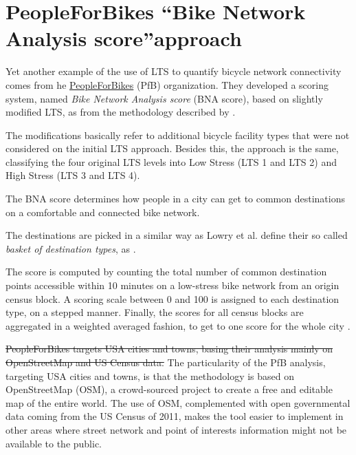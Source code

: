 \documentclass[information,article,submit,moreauthors,Latex,dvi2pdf,10pt,a4paper]{Definitions/mdpi}
\begin{document}
\section{PeopleForBikes \textquotedblleft Bike Network Analysis score\textquotedblright approach} \label{pfb}

\begin{mycolorbox}[colback=yellow]
Yet another example of the use of LTS to quantify bicycle network connectivity comes from he \href{https://peopleforbikes.org/}{PeopleForBikes} (PfB) organization. They developed a scoring system, named \textit{Bike Network Analysis score} (BNA score), based on slightly modified LTS, as from the methodology described by \cite{Mekuria2012b}. 
\end{mycolorbox}
\begin{mycolorbox}[colback=cyan]
The modifications basically refer to additional bicycle facility types that were not considered on the initial LTS approach. Besides this, the approach is the same, classifying the four original LTS levels into Low Stress (LTS 1 and LTS 2) and High Stress (LTS 3 and LTS 4).
\end{mycolorbox}
The BNA score determines how people in a city can get to common destinations on a comfortable and connected bike network. 
\begin{mycolorbox}[colback=yellow]
The destinations are picked in a similar way as Lowry et al. define their so called \textit{basket of destination types}, as  \cite[p.130]{Lowry2016}.
\end{mycolorbox}
The score is computed by counting the total number of common destination points accessible within 10 minutes on a low-stress bike network from an origin census block. A scoring scale between 0 and 100 is assigned to each destination type, on a stepped manner. Finally, the scores for all census blocks are aggregated in a weighted averaged fashion, to get to one score for the whole city \cite{PeopleforBikes2014}.

\begin{mycolorbox}[colback=yellow]
\sout{PeopleForBikes targets USA cities and towns, basing their analysis mainly on OpenStreetMap and US Census data.} The particularity of the PfB analysis, targeting USA cities and towns, is that the methodology is based on OpenStreetMap (OSM), a crowd-sourced project to create a free and editable map of the entire world. The use of OSM, complemented with open governmental data coming from the US Census of 2011, makes the tool easier to implement in other areas where street network and point of interests information might not be available to the public.
\end{mycolorbox}
\end{document}

